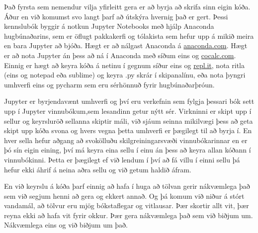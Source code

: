 Það fyrsta sem nemendur vilja yfirleitt gera er að byrja að skrifa sinn eigin kóða. 
Áður en við komumst svo langt þarf að útskýra hvernig það er gert. 
Þessi kennslubók byggir á notkun Jupyter Notebooks með hjálp Anaconda hugbúnaðarins, sem er öflugt pakkakerfi og tólakista sem hefur upp á mikið meira en bara Jupyter að bjóða. 
Hægt er að nálgast Anaconda á \href{www.anaconda.com}{anaconda.com}.
Hægt er að nota Jupyter án þess að ná í Anaconda með síðum eins og \href{www.cocalc.com}{cocalc.com}. 
Einnig er hægt að keyra kóða á netinu í gegnum síður eins og \href{www.repl.it}{repl.it}, nota ritla (eins og notepad eða sublime) og keyra .py skrár í skipanalínu, eða nota þyngri umhverfi eins og pycharm sem eru sérhönnuð fyrir hugbúnaðarþróun.

Jupyter er byrjendavænt umhverfi og því eru verkefnin sem fylgja þessari bók sett upp í Jupyter vinnubókum,sem lesandinn getur nýtt sér. 
Virkninni er skipt upp í sellur og keyrsluröð sellanna skiptir máli, við sjáum seinna mikilvægi þess að geta skipt upp kóða svona og hvers vegna þetta umhverfi er þægilegt til að byrja í. 
En hver sella hefur aðgang að svokölluðu skilgreiningarsvæði vinnubókarinnar en er þó sín eigin eining, því má keyra eina sellu í einu án þess að keyra allan kóðann í vinnubókinni.
Þetta er þægilegt ef við lendum í því að fá villu í einni sellu þá hefur ekki áhrif á neina aðra sellu og við getum haldið áfram.

En við keyrslu á kóða þarf einnig að hafa í huga að tölvan gerir nákvæmlega það sem við segjum henni að gera og ekkert annað.
Og þá komum við niður á stórt vandamál, að tölvur eru mjög bókstaflegar og vitlausar.
Þær skortir allt vit, þær reyna ekki að hafa vit fyrir okkur. 
Þær gera nákvæmlega það sem við biðjum um.
Nákvæmlega eins og við biðjum um það.

